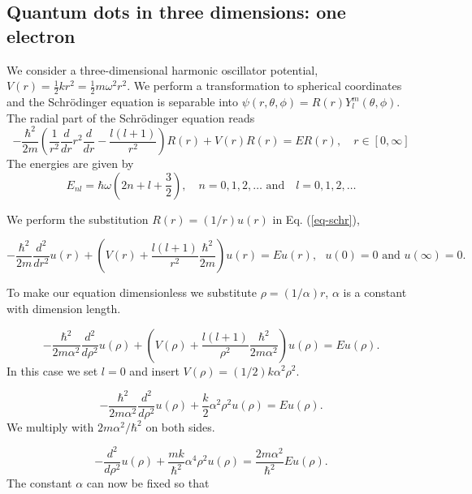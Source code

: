 \documentclass[a4paper]{article}
\begin{document}
\subsection{Quantum dots in three dimensions: one electron}

We consider a three-dimensional harmonic oscillator potential, $V(r) = \frac{1}{2}kr^2 = \frac{1}{2}m\omega^2r^2$. We perform a transformation to spherical coordinates and the Schrödinger equation is separable into $\psi(r, \theta, \phi) = R(r)Y^m_l(\theta, \phi)$. The radial part of the Schrödinger equation reads
\begin{equation}
  -\frac{\hbar^2}{2 m} \left ( \frac{1}{r^2} \frac{d}{dr} r^2
  \frac{d}{dr} - \frac{l (l + 1)}{r^2} \right )R(r)
     + V(r) R(r) = E R(r),\quad r \in [0, \infty]
\label{eq-schr}
\end{equation}
The energies are given by
\begin{equation}\label{eq: HO energy}
E_{nl}=  \hbar \omega \left(2n+l+\frac{3}{2}\right),\quad n=0,1,2,\dots \text{ and}\quad l=0,1,2,\dots
\end{equation}

We perform the substitution $R(r) = (1/r) u(r)$ in Eq. (\ref{eq-schr}),
% 

\begin{equation}
  -\frac{\hbar^2}{2 m} \frac{d^2}{dr^2} u(r) 
       + \left ( V(r) + \frac{l (l + 1)}{r^2}\frac{\hbar^2}{2 m}
                                    \right ) u(r)  = E u(r), \text{ } u(0)=0 \text{ and } u(\infty)=0.
\end{equation}
% 


To make our equation dimensionless we substitute $\rho = (1/\alpha) r$, $\alpha$ is a constant with dimension length.
% 

\begin{equation}
  -\frac{\hbar^2}{2 m \alpha^2} \frac{d^2}{d\rho^2} u(\rho) 
       + \left ( V(\rho) + \frac{l (l + 1)}{\rho^2}
         \frac{\hbar^2}{2 m\alpha^2} \right ) u(\rho)  = E u(\rho) .
\end{equation}
% 
In this case we set $l=0$ and insert $V(\rho) = (1/2) k \alpha^2\rho^2$.

\begin{equation}
  -\frac{\hbar^2}{2 m \alpha^2} \frac{d^2}{d\rho^2} u(\rho) 
       + \frac{k}{2} \alpha^2\rho^2u(\rho)  = E u(\rho) .
\end{equation}
We multiply with $2m\alpha^2/\hbar^2$ on both sides.

\begin{equation}
  -\frac{d^2}{d\rho^2} u(\rho) 
       + \frac{mk}{\hbar^2} \alpha^4\rho^2u(\rho)  = \frac{2m\alpha^2}{\hbar^2}E u(\rho) .
\end{equation}
The constant $\alpha$ can now be fixed
so that
\end{document}
